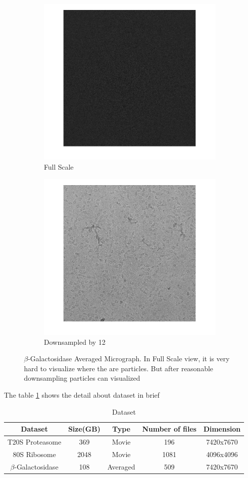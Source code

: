 \documentclass{report}
\begin{document}
\begin{figure}[h]
\centering
\begin{subfigure}{.5\textwidth}
\centering
\includegraphics[width=0.5\linewidth]{EM-10012-micrograph-full_micrograph}
\captionsetup{justification=centering}
\caption{ Full Scale }
\end{subfigure} 
\begin{subfigure}{.48\textwidth}
\centering
\includegraphics[width=0.5\linewidth]{EM-10012-micrograph-full-down-12_micrograph}
\captionsetup{justification=centering}
\caption{Downsampled by 12}
\end{subfigure}
\caption{ $\beta$-Galactosidase Averaged Micrograph. In Full Scale view, it is very hard to visualize where the are particles. But after reasonable downsampling particles can  visualized}
\label{fig:EM-10012-Avg-micrograph}
\end{figure}


The table \ref{tbl:Dataset} shows the detail about dataset in brief
\begin{table}[H]
\centering
  \begin{tabular}{|c|c|c|c|c|} 
    \hline \hline
      Dataset & Size(GB) & Type & Number of files & Dimension  \\ [0.5ex] 
    \hline \hline
    T20S Proteasome & 369 & Movie & 196 & 7420x7670 \\\hline
    80S Ribosome & 2048 & Movie & 1081 & 4096x4096 \\\hline
    $\beta$-Galactosidase & 108 & Averaged & 509 & 7420x7670 \\\hline
    \hline 
  \end{tabular}
\caption{Dataset}
\label{tbl:Dataset}
\end{table}
\end{document}
